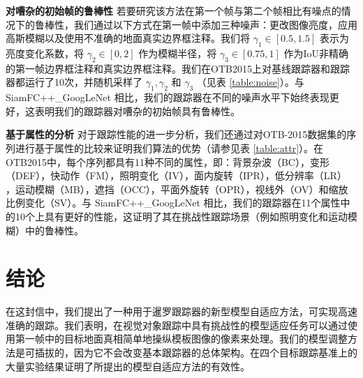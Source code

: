 \textbf{对嘈杂的初始帧的鲁棒性} 若要研究该方法在第一个帧与第二个帧相比有噪点的情况下的鲁棒性，我们通过以下方式在第一帧中添加三种噪声：更改图像亮度，应用高斯模糊以及使用不准确的地面真实边界框注释。我们将 $\gamma_1 \in [0.5, 1.5]$ 表示为亮度变化系数，将 $\gamma_2 \in [0, 2]$ 作为模糊半径，将 $\gamma_3 \in [0.75, 1]$ 作为IoU非精确的第一帧边界框注释和真实边界框注释。我们在OTB2015上对基线跟踪器和跟踪器都运行了10次，并随机采样了 $\gamma_1, \gamma_2$ 和 $\gamma_3$ （见表 \ref{table:noise}）。与 SiamFC++\_GoogLeNet \cite{SiamFC++} 相比，我们的跟踪器在不同的噪声水平下始终表现更好，这表明我们的跟踪器对嘈杂的初始帧具有鲁棒性。%

\textbf{基于属性的分析} 对于跟踪性能的进一步分析，我们还通过对OTB-2015数据集的序列进行基于属性的比较来证明我们算法的优势（请参见表 \ref{table:attr}）。在OTB2015中，每个序列都具有11种不同的属性，即：背景杂波（BC），变形（DEF），快动作（FM），照明变化（IV），面内旋转（IPR），低分辨率（LR） ，运动模糊（MB），遮挡（OCC），平面外旋转（OPR），视线外（OV）和缩放比例变化（SV）。与 SiamFC++\_GoogLeNet \cite{SiamFC++} 相比，我们的跟踪器在11个属性中的10个上具有更好的性能，这证明了其在挑战性跟踪场景（例如照明变化和运动模糊）中的鲁棒性。

\section{结论}
在这封信中，我们提出了一种用于暹罗跟踪器的新型模型自适应方法，可实现高速准确的跟踪。我们表明，在视觉对象跟踪中具有挑战性的模型适应任务可以通过使用第一帧中的目标地面真相简单地操纵模板图像的像素来处理。我们的模型调整方法是可插拔的，因为它不会改变基本跟踪器的总体架构。在四个目标跟踪基准上的大量实验结果证明了所提出的模型自适应方法的有效性。
